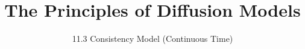 
\title{The Principles of Diffusion Models}
\subtitle{11.3 Consistency Model (Continuous Time)}


\begin{frame}
    \titlepage
\end{frame}


